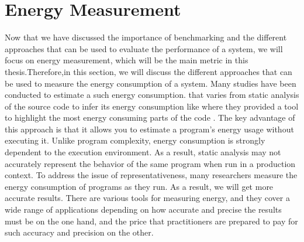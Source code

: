 

\section{Energy Measurement}
Now that we have discussed the importance of benchmarking and the different approaches that can be used to evaluate the performance of a system, we will focus on energy measurement, which will be the main metric in this thesis.Therefore,in this section, we will discuss the different approaches that can be used to measure the energy consumption of a system.
Many studies have been conducted to estimate a such energy consumption. that varies from static analysis of the source code to infer its energy consumption like \citeauthor{pereira_helping_2017} where they provided a tool to highlight the most energy consuming parts of the code \cite{pereira_helping_2017}.
The key advantage of this approach is that it allows you to estimate a program's energy usage without executing it.
Unlike program complexity, energy consumption is strongly dependent to the execution environment.
As a result, static analysis may not accurately represent the behavior of the same program when run in a production context.
To address the issue of representativeness, many researchers measure the energy consumption of programs as they run. As a result, we will get more accurate results.
There are various tools for measuring energy, and they cover a wide range of applications depending on how accurate and precise the results must be on the one hand, and the price that practitioners are prepared to pay for such accuracy and precision on the other.

